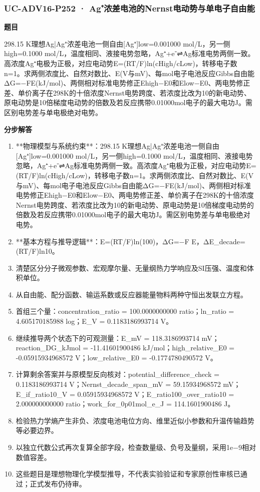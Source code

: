 \documentclass[UTF8,11pt,a4paper]{ctexart}
\begin{document}
\subsubsection*{UC-ADV16-P252 · Ag⁺浓差电池的Nernst电动势与单电子自由能}
\noindent\textbf{题目}\par
298.15 K理想Ag|Ag⁺浓差电池一侧自由[Ag⁺]low=0.001000 mol/L，另一侧high=0.1000 mol/L，温度相同、液接电势忽略，Ag⁺+e⁻⇌Ag标准电势两侧一致。高浓度Ag⁺电极为正极，对应电动势E=(RT/F)ln(cHigh/cLow)，转移电子数n=1。求两侧浓度比、自然对数比、E(V与mV)、每mol电子电池反应Gibbs自由能ΔG=−FE(kJ/mol)、两侧相对标准电势修正Ehigh−E0和Elow−E0、两电势修正差、单价离子在298K的十倍浓度Nernst电势跨度、若浓度比改为10的新电动势、原电动势是10倍梯度电动势的倍数及若反应携带0.01000mol电子的最大电功J。需区别电势差与单电极绝对电势。\par
\medskip\noindent\textbf{分步解答}
\begin{enumerate}
\item **物理模型与系统约束**：298.15 K理想Ag|Ag⁺浓差电池一侧自由[Ag⁺]low=0.001000 mol/L，另一侧high=0.1000 mol/L，温度相同、液接电势忽略，Ag⁺+e⁻⇌Ag标准电势两侧一致。高浓度Ag⁺电极为正极，对应电动势E=(RT/F)ln(cHigh/cLow)，转移电子数n=1。求两侧浓度比、自然对数比、E(V与mV)、每mol电子电池反应Gibbs自由能ΔG=−FE(kJ/mol)、两侧相对标准电势修正Ehigh−E0和Elow−E0、两电势修正差、单价离子在298K的十倍浓度Nernst电势跨度、若浓度比改为10的新电动势、原电动势是10倍梯度电动势的倍数及若反应携带0.01000mol电子的最大电功J。需区别电势差与单电极绝对电势。
\item **基本方程与推导逻辑**：E=(RT/F)ln(100)，ΔG=−F E，ΔE\_decade=(RT/F)ln10。
\item 清楚区分分子微观参数、宏观摩尔量、无量纲热力学响应及SI压强、温度和体积单位。
\item 从自由能、配分函数、输运系数或反应器能量物料两种守恒出发联立方程。
\item 首组三个量：concentration\_ratio = 100.0000000000 ratio；ln\_ratio = 4.605170185988 log；E\_V = 0.1183186993714 V。
\item 继续推导两个状态下的可观测量：E\_mV = 118.3186993714 mV；reaction\_DG\_kJmol = -11.41601900486 kJ/mol；high\_relative\_E0 = -0.05915934968572 V；low\_relative\_E0 = -0.1774780490572 V。
\item 计算剩余答案并与原模型反向核对：potential\_difference\_check = 0.1183186993714 V；Nernst\_decade\_span\_mV = 59.15934968572 mV；E\_if\_ratio10\_V = 0.05915934968572 V；E\_ratio100\_over\_ratio10 = 2.000000000000 ratio；work\_for\_0p01mol\_e\_J = 114.1601900486 J。
\item 检验热力学熵产生非负、浓度电池电位方向、维里近似小参数和升温传输趋势等必要边界。
\item 以独立代数公式再次复算全部字段，检查数量级、负号及量纲，采用1e−9相对数值容差。
\item 这些题目是理想物理化学模型推导，不代表实验验证和专家原创性审核已通过；正式发布仍待审。
\end{enumerate}
\end{document}
